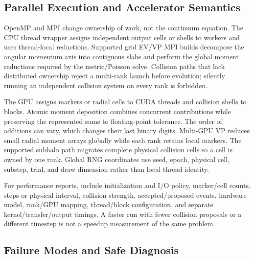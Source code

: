 \subsection{Parallel Execution and Accelerator Semantics}
\label{sec:parallel-shared}

OpenMP and MPI change ownership of work, not the continuum equation.  The CPU
thread wrapper assigns independent output cells or shells to workers and uses
thread-local reductions.  Supported grid EV/VP MPI builds decompose the
angular momentum axis into contiguous slabs and perform the global moment
reductions required by the metric/Poisson solve.  Collision paths that lack
distributed ownership reject a multi-rank launch before evolution; silently
running an independent collision system on every rank is forbidden.

The GPU assigns markers or radial cells to CUDA threads and collision shells
to blocks.  Atomic moment deposition combines concurrent contributions while preserving
the represented sums to floating-point tolerance. The order of additions can
vary, which changes their last binary digits.  Multi-GPU VP reduces
small radial moment arrays globally while each rank retains local markers.
The supported subhalo path migrates complete physical collision cells so a
cell is owned by one rank.  Global RNG coordinates use seed, epoch, physical
cell, substep, trial, and draw dimension rather than local thread identity.

For performance reports, include initialization and I/O policy, marker/cell
counts, steps or physical interval, collision strength, accepted/proposed
events, hardware model, rank/GPU mapping, thread/block configuration, and
separate kernel/transfer/output timings.  A faster run with fewer collision
proposals or a different timestep is not a speedup measurement of the same
problem.

\subsection{Failure Modes and Safe Diagnosis}
\label{sec:failure-modes-shared}

